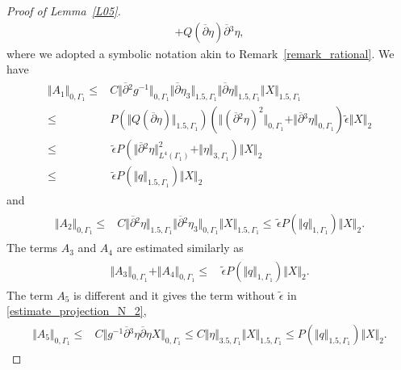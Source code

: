 \documentclass[10pt,reqno]{amsart}
\theoremstyle{plain}
\theoremstyle{definition}
\numberwithin{equation}{section}
\newcommand{\Ga}{\Gamma}
\newcommand{\la}{\lambda}
\newcommand{\norm}[1]{\Vert#1\Vert}
\begin{document}
{{{\begin{proof}[Proof of Lemma~\ref{L05}]
\begin{align}
+ Q(\overline{\partial} \eta) \overline{\partial}{}^3 \eta,
\nonumber
\end{align}
where we adopted a symbolic notation akin to Remark~\ref{remark_rational}.
We have
\begin{align}
\begin{split}
\norm{ A_1 }_{0,\Ga_1} 
\leq & 
C \norm{ \overline{\partial}{}^2 g^{-1} }_{0,\Ga_1} \norm{\overline{\partial} \eta_3 }_{1.5,\Ga_1}
\norm{ \overline{\partial} \eta }_{1.5,\Ga_1} \norm{ X }_{1.5,\Ga_1}
\\
\leq &  P(\norm{ Q(\overline{\partial} \eta )}_{1.5,\Ga_1})
 (\norm{ (\overline{\partial}{}^2 \eta )^2}_{0,\Ga_1} + 
\norm{\overline{\partial}{}^3 \eta}_{0,\Ga_1} ) \widetilde{\epsilon} \norm{X}_2
\\
\leq &
\, \widetilde{\epsilon} P
 (\norm{ \overline{\partial}{}^2 \eta }^2_{L^4(\Ga_1)} + 
\norm{ \eta}_{3,\Ga_1} )  \norm{X}_2
\\
\leq & \, \widetilde{\epsilon} P(\norm{q}_{1.5,\Ga_1} ) \norm{X}_2
\end{split}
\nonumber
\end{align}
and
\begin{align}
\begin{split}
\norm{A_2}_{0,\Ga_1} \leq & C \norm{ \overline{\partial}{}^2\eta }_{1.5,\Ga_1}
\norm{ \overline{\partial}{}^2 \eta_3}_{0,\Ga_1} \norm{X}_{1.5,\Ga_1}
\leq  \, \widetilde{\epsilon} P(\norm{q}_{1,\Ga_1}) \norm{X}_2.
\end{split}
\nonumber
\end{align}
The terms $A_3$ and $A_4$ are estimated similarly as
\begin{align}
\begin{split}
\norm{A_3}_{0,\Ga_1}  + \norm{A_4}_{0,\Ga_1}  
\leq & \, \widetilde{\epsilon} P(\norm{q}_{1,\Ga_1}) \norm{X}_2.
\end{split}
\nonumber
\end{align}
The term $A_5$ is different and it gives
the term without $\widetilde{\epsilon}$ in \eqref{estimate_projection_N_2},
\begin{align}
\begin{split}
\norm{ A_5 }_{0,\Ga_1} \leq & C \norm{ g^{-1} \overline{\partial}{}^3 \eta 
\overline{\partial} \eta X }_{0,\Ga_1} 
\leq  C \norm{\eta}_{3.5,\Ga_1} \norm{ X}_{1.5,\Ga_1}
\leq  P(\norm{q}_{1.5,\Ga_1} )\norm{X}_2.
\end{split}
\nonumber
\end{align}


\end{proof}}}}
\end{document}
